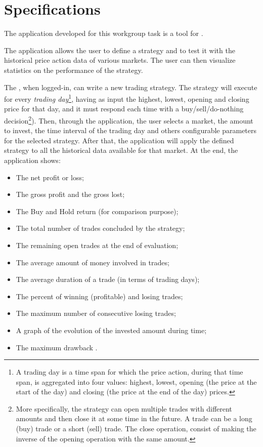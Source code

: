 \chapter{Specifications}\label{ch:specs}

The application developed for this workgroup task is a tool for
.

The application allows the user to define a strategy and to test it with the
historical price action data of various markets. The user can then visualize
statistics on the performance of the strategy.

The , when logged-in, can write a new trading strategy. The
strategy will execute for every \emph{trading day}\footnote{A trading day is a
time span for which the price action, during that time span, is aggregated into
four values: highest, lowest, opening (the price at the start of the day) and
closing (the price at the end of the day) prices.}, having as input the highest,
lowest, opening and closing price for that day, and it must respond each time
with a buy/sell/do-nothing decision\footnote{More specifically, the strategy can
open multiple trades with different amounts and then close it at some time in
the future. A trade can be a long (buy) trade or a short (sell) trade. The close
operation, consist of making the inverse of the opening operation with the same
amount.}). Then, through the application, the user selects a market, the amount
to invest, the time interval of the trading day and others configurable
parameters for the selected strategy. After that, the application will apply the
defined strategy to all the historical data available for that market. At the
end, the application shows:
\begin{itemize}
	\item The net profit or loss;
	\item The gross profit  and the gross lost;
	\item The Buy and Hold return (for comparison purpose);
	\item The total number of trades concluded by the strategy;
	\item The remaining open trades at the end of evaluation;
	\item The average amount of money involved in trades;
	\item The average duration of a trade (in terms of trading days);
	\item The percent of winning (profitable) and losing trades;
	\item The maximum number of consecutive losing trades;
	\item A graph of the evolution of the invested amount during time;
	\item The maximum drawback .
\end{itemize}

